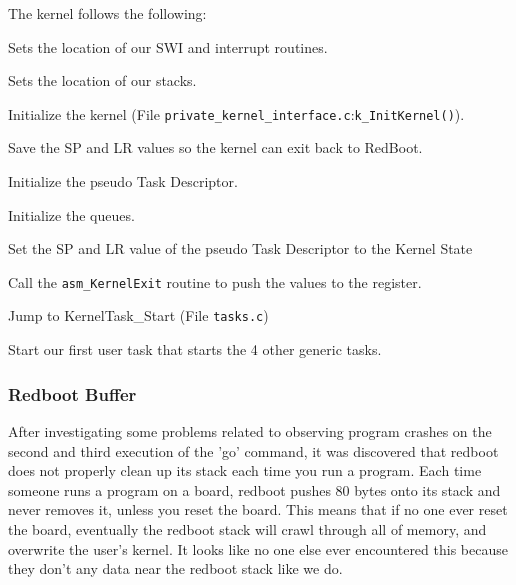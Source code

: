 \documentclass[letterpaper]{article}
\begin{document}
The kernel follows the following:
\begin{list}{.}
{
\setlength{\rightmargin}{\leftmargin}
}

\item Sets the location of our SWI and interrupt routines.

\item Sets the location of our stacks.

\item Initialize the kernel (File \texttt{private\_kernel\_interface.c}:\texttt{k\_InitKernel()}).
\begin{list}{.}
{
\setlength{\rightmargin}{\leftmargin}
}

\item Save the SP and LR values so the kernel can exit back to RedBoot.

\item Initialize the pseudo Task Descriptor.

\item Initialize the queues.

\item Set the SP and LR value of the pseudo Task Descriptor to the Kernel State

\item Call the \texttt{asm\_KernelExit} routine to push the values to the register.
\end{list}

\item Jump to KernelTask\_Start (File \texttt{tasks.c})

\item Start our first user task that starts the 4 other generic tasks.
\end{list}


\subsubsection{Redboot Buffer%
  \label{redboot-buffer}%
}

After investigating some problems related to observing program crashes on the second and third execution of the 'go' command, it was discovered that redboot does not properly clean up its stack each time you run a program.  Each time someone runs a program on a board, redboot pushes 80 bytes onto its stack and never removes it, unless you reset the board.  This means that if no one ever reset the board, eventually the redboot stack will crawl through all of memory, and overwrite the user's kernel.  It looks like no one else ever encountered this because they don't any data near the redboot stack like we do.
\end{document}
